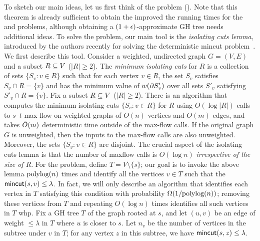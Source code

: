 To sketch our main ideas, let us first think of the \ct problem (). Note that this theorem is already sufficient to obtain the improved the running times for the \ssc and \apc problems, although obtaining a $(1+\epsilon)$-approximate GH tree needs additional ideas. To solve the \ct problem, our main tool is the {\em isolating cuts lemma}, introduced by the authors recently for solving the deterministic mincut problem~\cite{LiP20}. We first describe this tool.
%
Consider a weighted, undirected graph $G=(V,E)$ and a subset $R\subseteq V$ ($|R|\ge2$). The \emph{minimum isolating cuts} for $R$ is a collection of sets $\{S_v:v\in R\}$ such that for each vertex $v\in R$, the set $S_v$ satisfies $S_v\cap R=\{v\}$ and has the minimum value of $w(\partial S'_v)$ over all sets $S'_v$ satisfying $S'_v\cap R=\{v\}$.
\ED
%
%
Fix a subset $R\subseteq V$ ($|R|\ge2$). There is an algorithm that computes the minimum isolating cuts $\{S_v:v\in R\}$ for $R$ using $O(\log|R|)$ calls to $s$--$t$ max-flow on weighted graphs of $O(n)$ vertices and $O(m)$ edges, and takes $\tilde{O}(m)$ deterministic time outside of the max-flow calls. If the original graph $G$ is unweighted, then the inputs to the max-flow calls are also unweighted. Moreover, the sets $\{S_v:v\in R\}$ are disjoint.
\EL
%
The crucial aspect of the isolating cuts lemma is that the number of maxflow calls is $O(\log n)$ {\em irrespective of the size of $R$}. For the \ct problem, define $T= V\setminus \{s\}$; our goal is to invoke the above lemma $\textup{polylog}(n)$ times and identify all the vertices $v\in T$ such that the $\textsf{\textup{mincut}}(s, v)\le \lambda$. In fact, we will only describe an algorithm that identifies each vertex in $T$ satisfying this condition with probability $\Omega(1/\textup{polylog}(n))$; removing these vertices from $T$ and repeating $O(\log n)$ times identifies all such vertices in $T$ whp. Fix a GH tree $T$ of the graph rooted at $s$, and let $(u, v)$ be an edge of weight $\le \lambda$ in $T$ where $u$ is closer to $s$. Let $n_v$ be the number of vertices in the subtree under $v$ in $T$; for any vertex $z$ in this subtree, we have $\textsf{\textup{mincut}}(s, z) \le \lambda$.